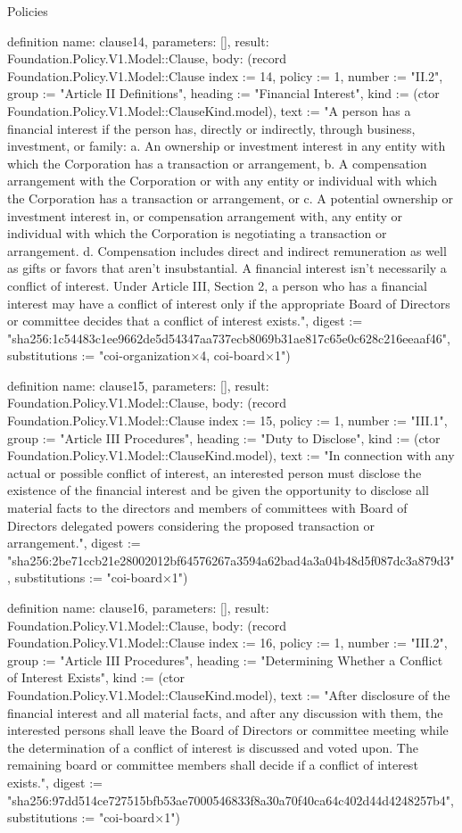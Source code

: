 \begin{lexlean}{Policies}
\begin{semanticmodule}
definition{
  name: clause14,
  parameters: [],
  result: Foundation.Policy.V1.Model::Clause,
  body: (record Foundation.Policy.V1.Model::Clause {index := 14, policy := 1, number := "II.2", group := "Article II Definitions", heading := "Financial Interest", kind := (ctor Foundation.Policy.V1.Model::ClauseKind.model), text := "A person has a financial interest if the person has, directly or indirectly, through business, investment, or family: a. An ownership or investment interest in any entity with which the Corporation has a transaction or arrangement, b. A compensation arrangement with the Corporation or with any entity or individual with which the Corporation has a transaction or arrangement, or c. A potential ownership or investment interest in, or compensation arrangement with, any entity or individual with which the Corporation is negotiating a transaction or arrangement. d. Compensation includes direct and indirect remuneration as well as gifts or favors that aren’t insubstantial. A financial interest isn’t necessarily a conflict of interest. Under Article III, Section 2, a person who has a financial interest may have a conflict of interest only if the appropriate Board of Directors or committee decides that a conflict of interest exists.", digest := "sha256:1c54483c1ee9662de5d54347aa737ecb8069b31ae817c65e0c628c216eeaaf46", substitutions := "coi-organization×4, coi-board×1"})
}

definition{
  name: clause15,
  parameters: [],
  result: Foundation.Policy.V1.Model::Clause,
  body: (record Foundation.Policy.V1.Model::Clause {index := 15, policy := 1, number := "III.1", group := "Article III Procedures", heading := "Duty to Disclose", kind := (ctor Foundation.Policy.V1.Model::ClauseKind.model), text := "In connection with any actual or possible conflict of interest, an interested person must disclose the existence of the financial interest and be given the opportunity to disclose all material facts to the directors and members of committees with Board of Directors delegated powers considering the proposed transaction or arrangement.", digest := "sha256:2be71ccb21e28002012bf64576267a3594a62bad4a3a04b48d5f087dc3a879d3", substitutions := "coi-board×1"})
}

definition{
  name: clause16,
  parameters: [],
  result: Foundation.Policy.V1.Model::Clause,
  body: (record Foundation.Policy.V1.Model::Clause {index := 16, policy := 1, number := "III.2", group := "Article III Procedures", heading := "Determining Whether a Conflict of Interest Exists", kind := (ctor Foundation.Policy.V1.Model::ClauseKind.model), text := "After disclosure of the financial interest and all material facts, and after any discussion with them, the interested persons shall leave the Board of Directors or committee meeting while the determination of a conflict of interest is discussed and voted upon. The remaining board or committee members shall decide if a conflict of interest exists.", digest := "sha256:97dd514ce727515bfb53ae7000546833f8a30a70f40ca64c402d44d4248257b4", substitutions := "coi-board×1"})
}


\end{semanticmodule}
\end{lexlean}
